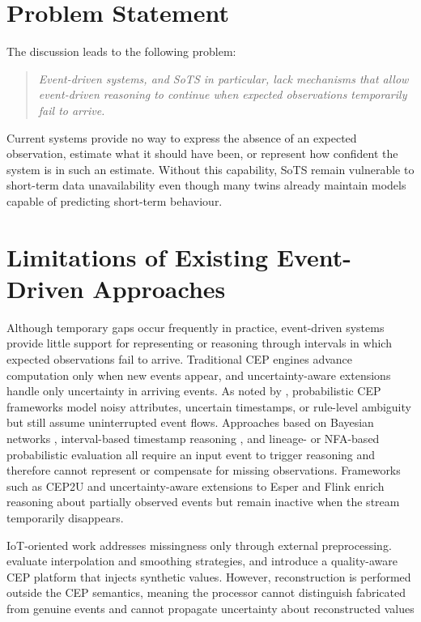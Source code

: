 \section{Problem Statement}

The discussion leads to the following problem:

\begin{quote}
\emph{Event-driven systems, and SoTS in particular, lack mechanisms that allow event-driven reasoning to continue when expected observations temporarily fail to arrive.}
\end{quote}

Current systems provide no way to express the absence of an expected observation, estimate what it should have been, or represent how confident the system is in such an estimate. Without this capability, SoTS remain vulnerable to short-term data unavailability even though many twins already maintain models capable of predicting short-term behaviour.


\section{Limitations of Existing Event-Driven Approaches}

Although temporary gaps occur frequently in practice, event-driven systems provide little support for representing or reasoning through intervals in which expected observations fail to arrive. Traditional CEP engines advance computation only when new events appear, and uncertainty-aware extensions handle only uncertainty in arriving events. As noted by \citet{alevizos2017probabilistic}, probabilistic CEP frameworks model noisy attributes, uncertain timestamps, or rule-level ambiguity but still assume uninterrupted event flows. Approaches based on Bayesian networks \citep{wasserkrug2010efficient, wasserkrug2012model}, interval-based timestamp reasoning \citep{zhang2013recognizing}, and lineage- or NFA-based probabilistic evaluation \citep{shen2008probabilistic, kawashima2010complex, chuanfei2010complex, wang2013complex} all require an input event to trigger reasoning and therefore cannot represent or compensate for missing observations. Frameworks such as CEP2U \citep{cugola2015introducing} and uncertainty-aware extensions to Esper and Flink \citep{moreno2019managing} enrich reasoning about partially observed events but remain inactive when the stream temporarily disappears.

IoT-oriented work addresses missingness only through external preprocessing. \citet{gkoulis2025assessing} evaluate interpolation and smoothing strategies, and \citet{gkoulis2024hybrid} introduce a quality-aware CEP platform that injects synthetic values. However, reconstruction is performed outside the CEP semantics, meaning the processor cannot distinguish fabricated from genuine events and cannot propagate uncertainty about reconstructed values


